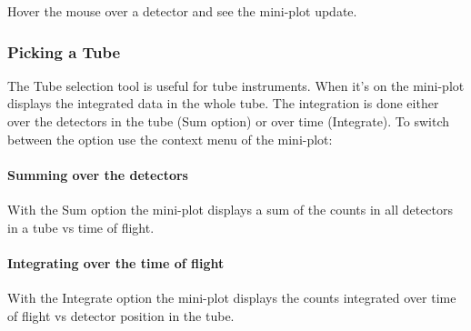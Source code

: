 \documentclass[letterpaper,10pt,english,openany]{sphinxmanual}
\begin{document}
\begin{figure}[H]
\centering

\noindent{}
\end{figure}

Hover the mouse over a detector and see the mini-plot update.


\subsubsection{Picking a Tube}
\label{\detokenize{mantid_basic_course/connecting_data_to_instruments/03_investigating_data:picking-a-tube}}
The Tube selection tool  is useful for tube instruments.
When it’s on the mini-plot displays the integrated data in the whole
tube. The integration is done either over the detectors in the tube (Sum
option) or over time (Integrate). To switch between the option use the
context menu of the mini-plot:

\begin{figure}[H]
\centering

\noindent{}
\end{figure}

\begin{DUlineblock}{0em}
\item[] 
\end{DUlineblock}


\paragraph{Summing over the detectors}
\label{\detokenize{mantid_basic_course/connecting_data_to_instruments/03_investigating_data:summing-over-the-detectors}}
With the Sum option the mini-plot displays a sum of the counts in all
detectors in a tube vs time of flight.

\begin{figure}[H]
\centering

\noindent{}
\end{figure}


\paragraph{Integrating over the time of flight}
\label{\detokenize{mantid_basic_course/connecting_data_to_instruments/03_investigating_data:integrating-over-the-time-of-flight}}
With the Integrate option the mini-plot displays the counts integrated
over time of flight vs detector position in the tube.
\end{document}
